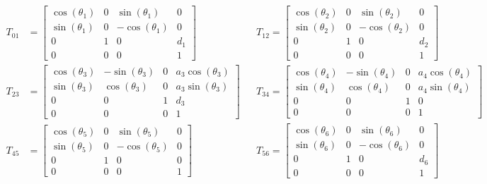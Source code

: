 \documentclass[onecolumn,10pt]{jhwhw}
\begin{document}
\begin{align*}
T_{01} &=
\left[\begin{matrix}\cos{\left (\theta_{1} \right )} & 0 & \sin{\left (\theta_{1} \right )} & 0\\\sin{\left (\theta_{1} \right )} & 0 & - \cos{\left (\theta_{1} \right )} & 0\\0 & 1 & 0 & d_{1}\\0 & 0 & 0 & 1\end{matrix}\right]
&&T_{12} =
\left[\begin{matrix}\cos{\left (\theta_{2} \right )} & 0 & \sin{\left (\theta_{2} \right )} & 0\\\sin{\left (\theta_{2} \right )} & 0 & - \cos{\left (\theta_{2} \right )} & 0\\0 & 1 & 0 & d_{2}\\0 & 0 & 0 & 1\end{matrix}\right] \\
T_{23} &=
\left[\begin{matrix}\cos{\left (\theta_{3} \right )} & - \sin{\left (\theta_{3} \right )} & 0 & a_{3} \cos{\left (\theta_{3} \right )}\\\sin{\left (\theta_{3} \right )} & \cos{\left (\theta_{3} \right )} & 0 & a_{3} \sin{\left (\theta_{3} \right )}\\0 & 0 & 1 & d_{3}\\0 & 0 & 0 & 1\end{matrix}\right]
&&T_{34} =
\left[\begin{matrix}\cos{\left (\theta_{4} \right )} & - \sin{\left (\theta_{4} \right )} & 0 & a_{4} \cos{\left (\theta_{4} \right )}\\\sin{\left (\theta_{4} \right )} & \cos{\left (\theta_{4} \right )} & 0 & a_{4} \sin{\left (\theta_{4} \right )}\\0 & 0 & 1 & 0\\0 & 0 & 0 & 1\end{matrix}\right] \\
T_{45} &=
\left[\begin{matrix}\cos{\left (\theta_{5} \right )} & 0 & \sin{\left (\theta_{5} \right )} & 0\\\sin{\left (\theta_{5} \right )} & 0 & - \cos{\left (\theta_{5} \right )} & 0\\0 & 1 & 0 & 0\\0 & 0 & 0 & 1\end{matrix}\right]
&&T_{56} =
\left[\begin{matrix}\cos{\left (\theta_{6} \right )} & 0 & \sin{\left (\theta_{6} \right )} & 0\\\sin{\left (\theta_{6} \right )} & 0 & - \cos{\left (\theta_{6} \right )} & 0\\0 & 1 & 0 & d_{6}\\0 & 0 & 0 & 1\end{matrix}\right] \\

\end{align*}
\end{document}
